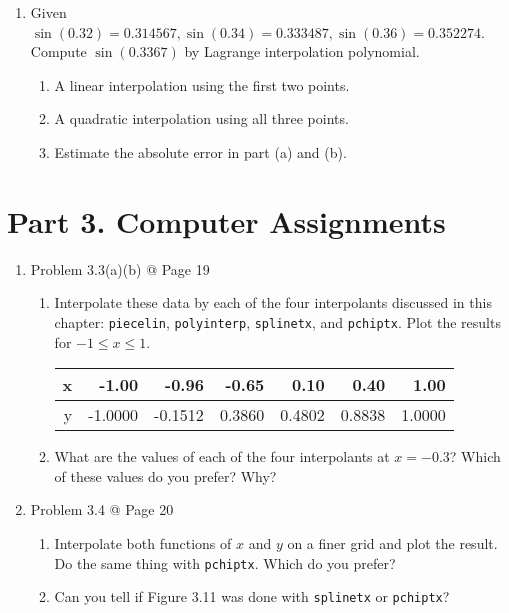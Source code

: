 \documentclass[10pt]{report}
\begin{document}
\begin{enumerate}
\begin{enumerate}
	\end{enumerate}

	\item 
	Given $\sin(0.32)=0.314567, \sin(0.34)=0.333487, \sin(0.36)=0.352274$. Compute $\sin(0.3367)$ by Lagrange interpolation polynomial.
	\begin{enumerate}
		\item 
		A linear interpolation using the first two points.
		
		\item 
		A quadratic interpolation using all three points.
		
		\item 
		Estimate the absolute error in part (a) and (b).
	\end{enumerate}
\end{enumerate}

\section*{Part 3. Computer Assignments}
\begin{enumerate}
	\item 
	Problem 3.3(a)(b) @ Page 19
	\begin{enumerate}
		\item
		Interpolate these data by each of the four interpolants discussed in this
		chapter: \verb|piecelin|, \verb|polyinterp|, \verb|splinetx|, and \verb|pchiptx|. Plot the results for $-1 \le x \le 1$.
		\begin{table}[H]
			\centering
			\begin{tabular}{*{7}{N}} \toprule
				x & -1.00 & -0.96 & -0.65 & 0.10 & 0.40 & 1.00\\ \midrule
				y & -1.0000 & -0.1512 & 0.3860 & 0.4802 & 0.8838 & 1.0000\\
				\bottomrule
			\end{tabular}
		\end{table}
		
		\item 
		What are the values of each of the four interpolants at $x = -0.3$? Which
		of these values do you prefer? Why?
	\end{enumerate}
	
	\item 
	Problem 3.4 @ Page 20
	\begin{enumerate}
		\item 
		Interpolate both functions of $x$ and $y$ on a finer grid and plot the result. Do the same thing with \verb|pchiptx|. Which do you prefer?
		
		\item 
		Can you tell if Figure 3.11 was done with \verb|splinetx| or \verb|pchiptx|?
	\end{enumerate}
\end{enumerate}
\end{document}
